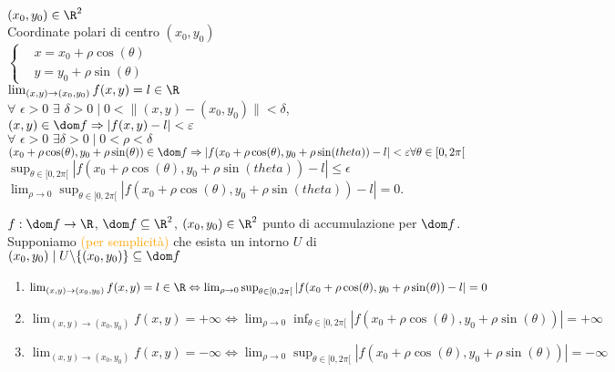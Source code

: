 $(x_0,y_0)\in \R^2$\\
\segnaposto %
Coordinate polari di centro $(x_0,y_0)$\\
$\begin{cases}
	& x=x_0+\rho \cos(\theta)\\
	& y=y_0+\rho \sin(\theta)
\end{cases}$\\
$\lim_{(x,y)\rightarrow(x_0,y_0)}f(x,y)=l\in \R $\\
$\forall\,\, \epsilon >0 \,\, \exists \,\, \delta >0 \mid 0 < \|(x,y)-(x_0,y_0)\|< \delta$, $(x,y)\in \dom f \Rightarrow |f(x,y)-l|< \epsilon$\\
$ \forall \,\, \epsilon >0 \,\, \exists \delta >0 \mid 0<\rho < \delta$\\
$(x_0+\rho \cos(\theta), y_0+\rho \sin(\theta))\in \dom f \Rightarrow |f(x_0+\rho \cos(\theta), y_0+\rho \sin(theta))-l|<\epsilon \forall\theta \in [0,2\pi[$\\
$\sup_{\theta \in [0,2\pi[}|f(x_0+\rho \cos(\theta), y_0+\rho \sin(theta))-l|\leq\epsilon$\\
$\lim_{\rho\rightarrow0}\sup_{\theta \in [0,2\pi[}|f(x_0+\rho \cos(\theta), y_0+\rho \sin(theta))-l|=0$.


\begin{theorem}
	$f:\dom f \rightarrow\R$, $\dom f \subseteq\R^2$, $(x_0,y_0)\in \R^2$ punto di accumulazione per $\dom f$. Supponiamo \textcolor{orange}{(per semplicità)} che esista un intorno $U$ di $(x_0,y_0)\mid U\backslash \{(x_0,y_0)\}\subseteq \dom f$
	\begin{enumerate}
		\item $\lim_{(x,y)\rightarrow(x_0,y_0)}f(x,y)=l\in\R \Leftrightarrow \lim_{\rho \rightarrow 0 } \sup_{\theta \in [0,2\pi[}|f(x_0+\rho\cos(\theta),y_0+\rho\sin(\theta))-l|=0$ 
		\item $\lim_{(x,y)\rightarrow(x_0,y_0)}f(x,y)=+\infty \Leftrightarrow \lim_{\rho\rightarrow 0}\inf_{\theta \in[0,2\pi[}|f(x_0+\rho \cos(\theta), y_0+\rho \sin(\theta))|=+\infty$
		\item $\lim_{(x,y)\rightarrow(x_0,y_0)}f(x,y)=-\infty\Leftrightarrow \lim_{\rho\rightarrow 0}\sup_{\theta \in[0,2\pi[}|f(x_0+\rho \cos(\theta), y_0+\rho \sin(\theta))|=-\infty$
	\end{enumerate}
\end{theorem}


